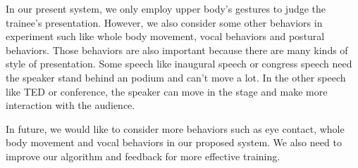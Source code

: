 \par In our present system, we only employ upper body's gestures to judge the trainee's presentation. However, we also consider some other behaviors in experiment such like whole body movement, vocal behaviors and postural behaviors. Those behaviors are also important because there are many kinds of style of presentation. Some speech like inaugural speech or congress speech need the speaker stand behind an podium and can't move a lot. In the other speech like TED or conference, the speaker can move in the stage and make more interaction with the audience. 
\par In future, we would like to consider more behaviors such as eye contact, whole body movement and vocal behaviors in our proposed system. We also need to improve our algorithm and feedback for more effective training. 
